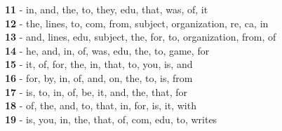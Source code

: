 \textbf{11} - in, and, the, to, they, edu, that, was, of, it\\
\textbf{12} - the, lines, to, com, from, subject, organization, re, ca, in\\
\textbf{13} - and, lines, edu, subject, the, for, to, organization, from, of\\
\textbf{14} - he, and, in, of, was, edu, the, to, game, for\\
\textbf{15} - it, of, for, the, in, that, to, you, is, and\\
\textbf{16} - for, by, in, of, and, on, the, to, is, from\\
\textbf{17} - is, to, in, of, be, it, and, the, that, for\\
\textbf{18} - of, the, and, to, that, in, for, is, it, with\\
\textbf{19} - is, you, in, the, that, of, com, edu, to, writes\\
